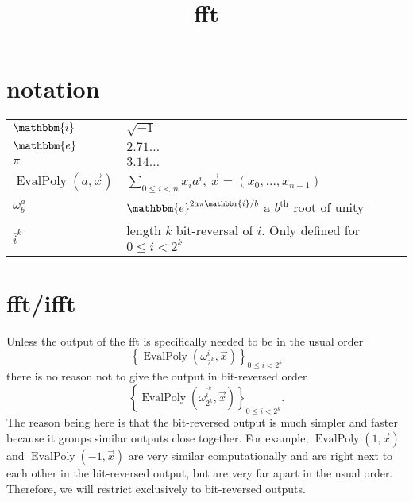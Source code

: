 \documentclass[12 pt]{amsart}
\newcommand{\om}[2] {\omega_{#1}^{#2}}
\newcommand{\ee}[0] {\mathbbm{e}}
\newcommand{\ii}[0] {\mathbbm{i}}
\begin{document}
\title{fft}

\section{notation}

\begin{tabular}{l|l}
$\ii$ & $\sqrt{-1}$ \\
$\ee$ & $2.71\dots$ \\
$\pi$ & $3.14\dots$ \\
$\operatorname{EvalPoly}(a, \vec{x})$ & $\sum_{0 \le i < n} x_i a^i$, $\vec{x} = (x_0, \dots, x_{n-1})$\\
$\om{b}{a}$ & $\ee^{2 a \pi \ii / b}$ a $b^{\text{th}}$ root of unity\\
$\overline{i}^k$ & length $k$ bit-reversal of $i$. Only defined for $0 \le i < 2^k$\\
\end{tabular} 

\section{fft/ifft}

Unless the output of the fft is specifically needed to be in the usual order
\begin{equation*}
\left\{\operatorname{EvalPoly}(\om{2^k}{i}, \vec{x})\right\}_{0 \le i < 2^k}
\end{equation*}
there is no reason not to give the output in bit-reversed order
\begin{equation*}
\left\{\operatorname{EvalPoly}(\om{2^k}{\overline{i}^k}, \vec{x})\right\}_{0 \le i < 2^k}\text{.}
\end{equation*}
The reason being here is that the bit-reversed output is much simpler and faster because it
groups similar outputs close together. For example, $\operatorname{EvalPoly}(1, \vec{x})$ and
$\operatorname{EvalPoly}(-1, \vec{x})$ are very similar computationally and are right next to
each other in the bit-reversed output, but are very far apart in the usual order. Therefore,
we will restrict exclusively to bit-reversed outputs.
\end{document}
